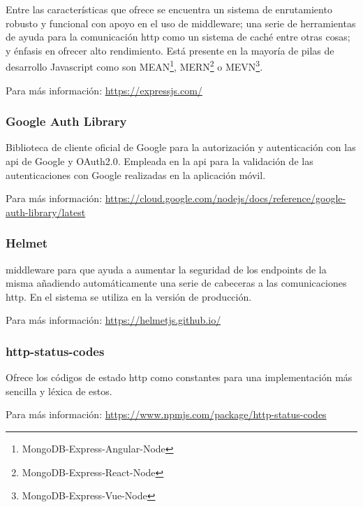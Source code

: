 Entre las características que ofrece se encuentra un sistema de enrutamiento robusto y funcional con apoyo en el uso de \gls{middleware}; una serie de herramientas de ayuda para la comunicación \acrshort{http} como un sistema de caché entre otras cosas; y énfasis en ofrecer alto rendimiento. Está presente en la mayoría de pilas de desarrollo Javascript como son MEAN\footnote{MongoDB-Express-Angular-Node}, MERN\footnote{MongoDB-Express-React-Node} o MEVN\footnote{MongoDB-Express-Vue-Node}.

Para más información: \href{https://expressjs.com/}{https://expressjs.com/}

\subsubsection{Google Auth Library}
\label{lib:api:google_auth_library}

Biblioteca de cliente oficial de Google para la autorización y autenticación con las \acrshort{api} de Google y OAuth2.0\cite{rfc6749}. Empleada en la \acrshort{api} para la validación de las autenticaciones con Google realizadas en la aplicación móvil.

Para más información: \href{https://cloud.google.com/nodejs/docs/reference/google-auth-library/latest}{https://cloud.google.com/nodejs/docs/reference/google-auth-library/latest}

\subsubsection{Helmet}
\label{lib:api:helmet}

\Gls{middleware} para  que ayuda a aumentar la seguridad de los \glspl{endpoint} de la misma añadiendo automáticamente una serie de cabeceras a las comunicaciones \acrshort{http}. En el sistema se utiliza en la versión de producción.

Para más información: \href{https://helmetjs.github.io/}{https://helmetjs.github.io/}

\subsubsection{http-status-codes}
\label{lib:api:http_status_codes}

Ofrece los códigos de estado \acrshort{http} como constantes para una implementación más sencilla y léxica de estos.

Para más información: \href{https://www.npmjs.com/package/http-status-codes}{https://www.npmjs.com/package/http-status-codes}

